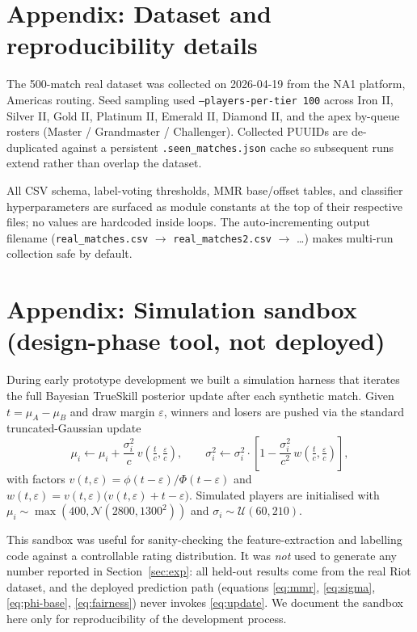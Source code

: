 \documentclass{article}
\begin{document}
\appendix
\section{Appendix: Dataset and reproducibility details}

The 500-match real dataset was collected on 2026-04-19 from the NA1
platform, Americas routing. Seed sampling used
\texttt{--players-per-tier 100} across Iron II, Silver II, Gold II,
Platinum II, Emerald II, Diamond II, and the apex by-queue rosters
(Master / Grandmaster / Challenger). Collected PUUIDs are de-duplicated
against a persistent \texttt{.seen\_matches.json} cache so subsequent
runs extend rather than overlap the dataset.

All CSV schema, label-voting thresholds, MMR base/offset tables, and
classifier hyperparameters are surfaced as module constants at the top of
their respective files; no values are hardcoded inside loops. The
auto-incrementing output filename (\texttt{real\_matches.csv} $\to$
\texttt{real\_matches2.csv} $\to$ \ldots) makes multi-run collection safe
by default.

\section{Appendix: Simulation sandbox (design-phase tool, not deployed)}
\label{app:sandbox}

During early prototype development we built a simulation harness that
iterates the full Bayesian TrueSkill posterior update after each synthetic
match. Given $t = \mu_A - \mu_B$ and draw margin $\varepsilon$, winners
and losers are pushed via the standard truncated-Gaussian update
\begin{equation}
\mu_i \leftarrow \mu_i + \frac{\sigma_i^2}{c}\, v\!\left(\tfrac{t}{c},
\tfrac{\varepsilon}{c}\right),
\qquad
\sigma_i^2 \leftarrow \sigma_i^2 \cdot \left[1 - \frac{\sigma_i^2}{c^2}\,
w\!\left(\tfrac{t}{c}, \tfrac{\varepsilon}{c}\right)\right],
\label{eq:update}
\end{equation}
with factors
$v(t, \varepsilon) = \phi(t-\varepsilon)/\Phi(t-\varepsilon)$ and
$w(t, \varepsilon) = v(t,\varepsilon)\big(v(t,\varepsilon)+t-\varepsilon\big)$.
Simulated players are initialised with $\mu_i \sim
\max(400, \mathcal{N}(2800, 1300^2))$ and $\sigma_i \sim
\mathcal{U}(60, 210)$.

This sandbox was useful for sanity-checking the feature-extraction and
labelling code against a controllable rating distribution. It was
\emph{not} used to generate any number reported in
Section~\ref{sec:exp}: all held-out results come from the real Riot
dataset, and the deployed prediction path (equations \eqref{eq:mmr},
\eqref{eq:sigma}, \eqref{eq:phi-base}, \eqref{eq:fairness}) never invokes
\eqref{eq:update}. We document the sandbox here only for reproducibility
of the development process.
\end{document}
